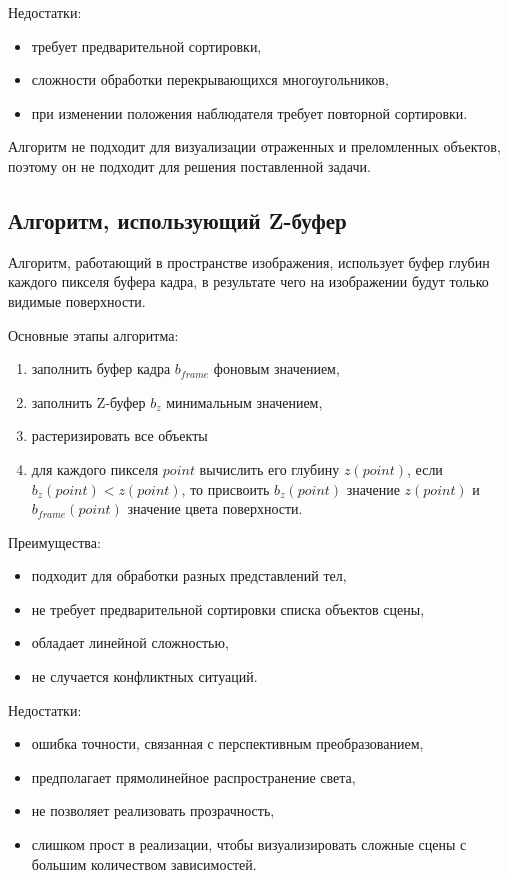 Недостатки:

\begin{itemize}
	\item требует предварительной сортировки,
	\item сложности обработки перекрывающихся многоугольников,
	\item при изменении положения наблюдателя требует повторной сортировки.
\end{itemize}

Алгоритм не подходит для визуализации отраженных и преломленных объектов, поэтому он не подходит для решения поставленной задачи.

\subsection{Алгоритм, использующий Z-буфер}

Алгоритм, работающий в пространстве изображения, использует буфер глубин каждого пикселя буфера кадра, в результате чего на изображении будут только видимые поверхности.

Основные этапы алгоритма:
\begin{enumerate}
	\item заполнить буфер кадра $b_{frame}$ фоновым значением,
	\item заполнить Z-буфер $b_{z}$ минимальным значением,
	\item растеризировать все объекты
	\item для каждого пикселя $point$ вычислить его глубину $z(point)$, если $b_z(point) < z(point)$, то присвоить $b_z(point)$ значение $z(point)$ и $b_{frame}(point)$ значение цвета поверхности.
\end{enumerate}

Преимущества:

\begin{itemize}
	\item подходит для обработки разных представлений тел,
	\item не требует предварительной сортировки списка объектов сцены,
	\item обладает линейной сложностью,
	\item не случается конфликтных ситуаций.
\end{itemize}

Недостатки:

\begin{itemize}
	\item ошибка точности, связанная с перспективным преобразованием,
	\item предполагает прямолинейное распространение света,
	\item не позволяет реализовать прозрачность,
	\item слишком прост в реализации, чтобы визуализировать сложные сцены с большим количеством зависимостей.
\end{itemize}

